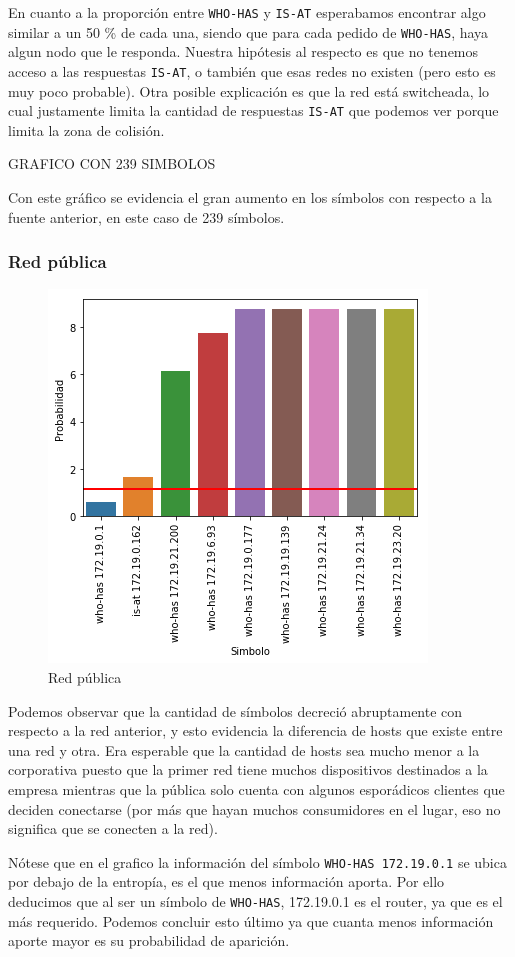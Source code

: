 En cuanto a la proporción entre \texttt{WHO-HAS} y \texttt{IS-AT} esperabamos encontrar algo similar a un 50 \% de cada una, siendo que para cada pedido de \texttt{WHO-HAS}, haya algun nodo que le responda. Nuestra hipótesis al respecto es que no tenemos acceso a las respuestas  \texttt{IS-AT}, o también que esas redes no existen (pero esto es muy poco probable). Otra posible explicación es que la red está switcheada, lo cual justamente limita la cantidad de respuestas \texttt{IS-AT} que podemos ver porque limita la zona de colisión.

GRAFICO CON 239 SIMBOLOS

Con este gráfico se evidencia el gran aumento en los símbolos con respecto a la fuente anterior, en este caso de 239 símbolos.
\subsubsection{Red pública}

\begin{figure}[H]
	\centering
	\includegraphics[width=.5\linewidth]{imagenes/mac_hosts}
	\caption{Red pública}
\end{figure}

Podemos observar que la cantidad de símbolos decreció abruptamente con respecto a la red anterior, y esto evidencia la diferencia de hosts que existe entre una red y otra. Era esperable que la cantidad de hosts sea mucho menor a la corporativa puesto que la primer red tiene muchos dispositivos destinados a la empresa mientras que la pública solo cuenta con algunos esporádicos clientes que deciden conectarse (por más que hayan muchos consumidores en el lugar, eso no significa que se conecten a la red).

Nótese que en el grafico la información del símbolo \texttt{WHO-HAS 172.19.0.1} se ubica por debajo de la entropía, es el que menos información aporta. Por ello deducimos que al ser un símbolo de \texttt{WHO-HAS}, 172.19.0.1 es el router, ya que es el más requerido. Podemos concluir esto último ya que cuanta menos información aporte mayor es su probabilidad de aparición.

